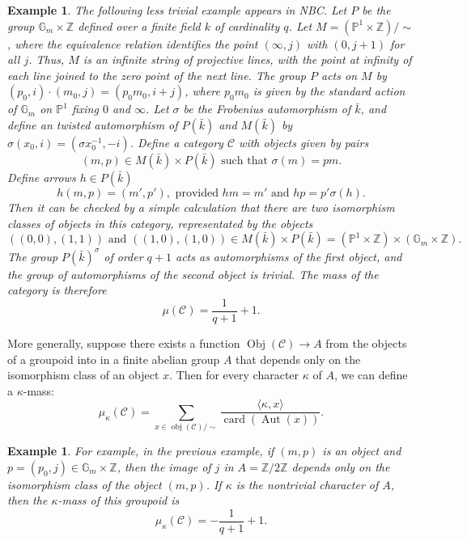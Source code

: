 \documentclass[brochure,english,12pt]{bourbaki}
\newtheorem{example}[equation]{Example}
\def\op#1{{\operatorname{#1}}}
\newcommand{\ring}[1]{\mathbb{#1}}
\def\C{{\mathcal C}}
\begin{document}
\begin{example}\label{ex:groupoid}
The following less trivial example appears in NBC.  Let $P$ be the
group $\ring{G}_m\times \ring{Z}$ defined over a finite field $k$ of cardinality $q$.
Let $M = (\ring{P}^1\times\ring{Z})/\sim$, where the equivalence
relation identifies the point $(\infty,j)$ with $(0,j+1)$   for all $j$.
Thus, $M$ is an infinite string of projective lines, with the point at infinity of each line joined to the
zero point of the next line.  The group $P$ acts on $M$ by $(p_0,i)\cdot
(m_0,j) = (p_0 m_0,i+j)$, where $p_0m_0$ is given by the standard action of
$\ring{G}_m$ on $\ring{P}^1$ fixing $0$ and $\infty$.  
Let $\sigma$ be the Frobenius automorphism
of $\bar k$, and define an twisted automorphism of $P(\bar k)$ and $M(\bar k)$
by $\sigma(x_0,i) = (\sigma x_0^{-1},-i)$.  Define a category $\mathcal C$ with
objects given by pairs 
\begin{equation}\label{eqn:objects}
(m,p)\in M(\bar k)\times P(\bar k) \text{ such that } \sigma(m) = p
m.
\end{equation}
Define  arrows $h\in P(\bar k)$ 
\begin{equation}\label{eqn:arrows}
h(m,p) = (m',p'),    \text{ provided } hm = m' \text{ and } h p = p'\sigma(h).
\end{equation}  
Then it can be checked by a simple
calculation that there are two isomorphism classes of objects in this
category, representated by the objects
\[
((0,0),(1,1))\text{ and }  ((1,0),(1,0))\in M(\bar k)\times P(\bar k) = 
(\ring{P}^1\times\ring{Z}) \times (\ring{G}_m\times\ring{Z}).
\]
The group $P(\bar k)^\sigma$ of order $q+1$ acts as automorphisms of the first object,
and the group of automorphisms of the second object is trivial.  The mass of the category
is therefore
\[
\mu(\C) = \frac{1}{q+1} + 1.
\]
\end{example}

More generally, suppose there exists a function $\op{Obj}(\C)\to  A$ from the objects
of a groupoid into in a finite abelian group $A$ that
depends only on the isomorphism class of an object $x$.  Then for every
character $\kappa$ of $A$, we can define a $\kappa$-mass:
\[
\mu_\kappa(\C)= \sum_{x\in \op{obj}(\C)/\sim} \frac{\langle\kappa,x\rangle}{\op{card}(\op{Aut}(x))}.
\]

\begin{example}
For example, in the previous example, if $(m,p)$ is an object and $p=(p_0,j)\in \ring{G}_m\times\ring{Z}$,
then the image of $j$ in $A=\ring{Z}/2\ring{Z}$ depends only on the isomorphism class of the
object $(m,p)$.  If $\kappa$ is the nontrivial character of $A$, then the 
$\kappa$-mass of this groupoid is
\[
\mu_\kappa(\C) = -\frac{1}{q+1} + 1.
\]
\end{example}
\end{document}
